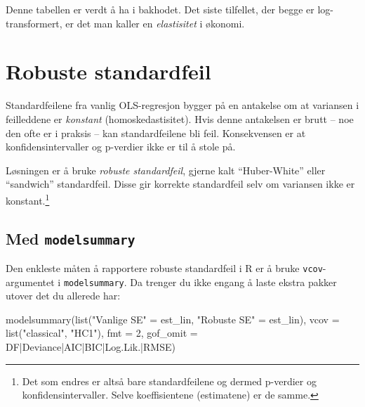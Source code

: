 \documentclass[
  norsk,
  letterpaper,
  DIV=11,
  numbers=noendperiod]{scrreprt}
\newenvironment{Shaded}{\begin{snugshade}}{\end{snugshade}}
\newcommand{\AttributeTok}[1]{\textcolor[rgb]{0.40,0.45,0.13}{#1}}
\newcommand{\DecValTok}[1]{\textcolor[rgb]{0.68,0.00,0.00}{#1}}
\newcommand{\FunctionTok}[1]{\textcolor[rgb]{0.28,0.35,0.67}{#1}}
\newcommand{\NormalTok}[1]{\textcolor[rgb]{0.00,0.23,0.31}{#1}}
\newcommand{\OtherTok}[1]{\textcolor[rgb]{0.00,0.23,0.31}{#1}}
\newcommand{\StringTok}[1]{\textcolor[rgb]{0.13,0.47,0.30}{#1}}
\theoremstyle{definition}
\theoremstyle{remark}
\begin{document}
Denne tabellen er verdt å ha i bakhodet. Det siste tilfellet, der begge
er log-transformert, er det man kaller en \emph{elastisitet} i økonomi.

\section{Robuste standardfeil}\label{robuste-standardfeil}

Standardfeilene fra vanlig OLS-regresjon bygger på en antakelse om at
variansen i feilleddene er \emph{konstant} (homoskedastisitet). Hvis
denne antakelsen er brutt -- noe den ofte er i praksis -- kan
standardfeilene bli feil. Konsekvensen er at konfidensintervaller og
p-verdier ikke er til å stole på.

Løsningen er å bruke \emph{robuste standardfeil}, gjerne kalt
``Huber-White'' eller ``sandwich'' standardfeil. Disse gir korrekte
standardfeil selv om variansen ikke er konstant.\footnote{Det som endres
  er altså bare standardfeilene og dermed p-verdier og
  konfidensintervaller. Selve koeffisientene (estimatene) er de samme.}

\subsection{\texorpdfstring{Med
\texttt{modelsummary}}{Med modelsummary}}\label{med-modelsummary}

Den enkleste måten å rapportere robuste standardfeil i R er å bruke
\texttt{vcov}-argumentet i \texttt{modelsummary}. Da trenger du ikke
engang å laste ekstra pakker utover det du allerede har:

\begin{Shaded}
\begin{Highlighting}[]
\FunctionTok{modelsummary}\NormalTok{(}\FunctionTok{list}\NormalTok{(}\StringTok{"Vanlige SE"} \OtherTok{=}\NormalTok{ est\_lin, }\StringTok{"Robuste SE"} \OtherTok{=}\NormalTok{ est\_lin),}
             \AttributeTok{vcov =} \FunctionTok{list}\NormalTok{(}\StringTok{"classical"}\NormalTok{, }\StringTok{"HC1"}\NormalTok{),}
             \AttributeTok{fmt =} \DecValTok{2}\NormalTok{,}
             \AttributeTok{gof\_omit =} \StringTok{\textquotesingle{}DF|Deviance|AIC|BIC|Log.Lik.|RMSE\textquotesingle{}}\NormalTok{)}
\end{Highlighting}
\end{Shaded}
\end{document}
